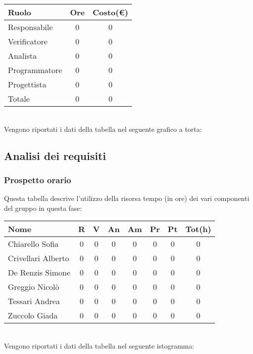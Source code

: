 \begin{tabular}{|l|c|c|}
\hline
Ruolo & Ore & Costo(€)\\
\hline
Responsabile & 0 & 0\\
Verificatore & 0 & 0\\
Analista & 0 & 0\\
Programmatore & 0 & 0\\
Progettista & 0 & 0\\
Totale & 0& 0\\
\hline
\end{tabular}\\


Vengono riportati i dati della tabella nel seguente grafico a torta: \\





\subsection{Analisi dei requisiti}

\subsubsection{Prospetto orario}
Questa tabella descrive l'utilizzo della risorsa tempo (in ore) dei vari componenti del gruppo in questa fase: \\

\begin{tabular}{|l|cccccc|c|}
\hline
Nome & R &  V & An & Am & Pr & Pt & Tot(h)\\
\hline
Chiarello Sofia & 0 & 0 & 0 & 0 & 0 & 0 & 0\\
Crivellari Alberto & 0 & 0 & 0 & 0 & 0 & 0 & 0\\
De Renzis Simone & 0 & 0 & 0 & 0 & 0 & 0 & 0\\
Greggio Nicolò & 0 & 0 & 0 & 0 & 0 & 0 & 0\\
Tessari Andrea & 0 & 0 & 0 & 0 & 0 & 0 & 0\\
Zuccolo Giada & 0 & 0 & 0 & 0 & 0 & 0 & 0\\
\hline
\end{tabular}
\\
Vengono riportati i dati della tabella nel seguente istogramma: \\

